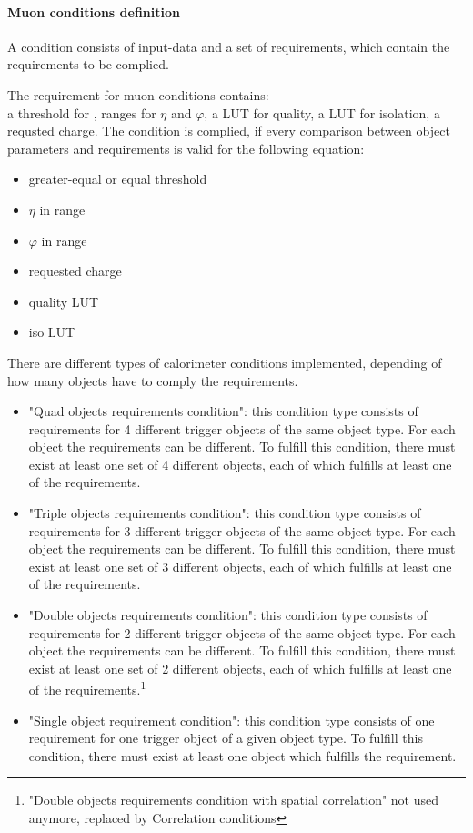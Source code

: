 \clearpage

\paragraph{Muon conditions definition}\label{sec:gtl:muon_cond_def}

A condition consists of input-data and a set of requirements, which contain the requirements to be complied.

The requirement for muon conditions contains:\\
a threshold for \pt, ranges for $\eta$ and $\varphi$, a LUT for quality, a LUT for isolation, 
a requsted charge.
The condition is complied, if every comparison between object parameters and requirements is valid for the following equation:
\begin{itemize}
\item \pt greater-equal or equal threshold
\item $\eta$ in range
\item $\varphi$ in range
\item requested charge 
\item quality LUT
\item iso LUT
\end{itemize}

There are different types of calorimeter conditions implemented, depending of how many objects have to comply the requirements.
\begin{itemize}
\item "Quad objects requirements condition": this condition type consists of requirements for 4 different trigger objects of the same object type. 
For each object the requirements can be different. To fulfill this condition, there must exist at least one set of 4 different objects,
each of which fulfills at least one of the requirements.
\item "Triple objects requirements condition": this condition type consists of requirements for 3 different trigger objects of the same object type. 
For each object the requirements can be different. To fulfill this condition, there must exist at least one set of 3 different objects,
each of which fulfills at least one of the requirements.
\item "Double objects requirements condition": this condition type consists of requirements for 2 different trigger objects of the same object type. 
For each object the requirements can be different. To fulfill this condition, there must exist at least one set of 2 different objects,
each of which fulfills at least one of the requirements.\footnote{"Double objects requirements condition with spatial correlation" not used anymore, replaced by Correlation conditions}
\item "Single object requirement condition": this condition type consists of one requirement for one trigger object of a given object type. 
To fulfill this condition, there must exist at least one object which fulfills the requirement.

\end{itemize}

